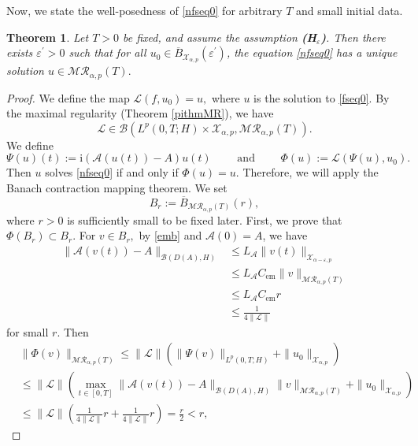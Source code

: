 \documentclass[reqno]{amsart}
\newtheorem{theorem}{Theorem}[section]
\numberwithin{equation}{section}
\begin{document}
Now, we state the well-posedness of \eqref{nfseq0} for arbitrary $T$ and small initial data.
\begin{theorem}\label{thm:quasi}
Let $T>0$ be fixed, and assume the assumption \textbf{(H$_\varepsilon$)}. Then there exists $\varepsilon^\prime>0$ such that for all $u_0\in \overline{B}_{\mathcal{X}_{\alpha,p}}(\varepsilon^\prime)$,
the equation \eqref{nfseq0} has a unique solution $u\in \mathcal{M}\mathcal{R}_{\alpha,p}(T).$
\end{theorem}
\begin{proof}
We define the map $\mathcal{L}(f,u_0)=u,$ where $u$ is the solution to \eqref{fseq0}. By the maximal regularity (Theorem \ref{pithmMR}), we have $$\mathcal{L}\in \mathcal{B}\left(L^p(0,T;H)\times \mathcal{X}_{\alpha,p}, \mathcal{M}\mathcal{R}_{\alpha,p}(T)\right).$$ 
We define
$$\Psi(u)(t):=\mathrm{i}(\mathcal{A}(u(t))-A)u(t) \qquad \text{ and } \qquad \Phi(u):=\mathcal{L}(\Psi(u), u_0).$$
Then $u$ solves \eqref{nfseq0} if and only if $\Phi(u)=u$. Therefore, we will apply the Banach contraction mapping theorem. We set
$$B_r:=\overline{B}_{\mathcal{M}\mathcal{R}_{\alpha,p}(T)}(r),$$
where $r>0$ is sufficiently small to be fixed later. First, we prove that $\Phi (B_r)\subset B_r$. For $v\in B_r,$ by \eqref{emb} and $\mathcal{A}(0)=A$, we have 
\begin{align*}
\|\mathcal{A}(v(t))-A\|_{\mathcal{B}(D(A),H)} &\le L_\mathcal{A} \|v(t)\|_{\mathcal{X}_{\alpha-\varepsilon,p}}\\
&\le L_\mathcal{A} C_{\mathrm{em}} \|v\|_{\mathcal{M}\mathcal{R}_{\alpha,p}(T)}\\
&\le  L_\mathcal{A} C_{\mathrm{em}} r\\
& \le \frac{1}{4\|\mathcal{L}\|}
\end{align*}
for small $r$. Then
\begin{align*}
&\|\Phi(v)\|_{\mathcal{M}\mathcal{R}_{\alpha,p}(T)} \le \|\mathcal{L}\| \left(\|\Psi(v)\|_{L^p(0,T;H)}+\|u_0\|_{\mathcal{X}_{\alpha,p}}\right)\\
&\le \|\mathcal{L}\| \left(\max_{t\in [0,T]} \|\mathcal{A}(v(t))-A\|_{\mathcal{B}(D(A),H)}\|v\|_{\mathcal{M}\mathcal{R}_{\alpha,p}(T)}+\|u_0\|_{\mathcal{X}_{\alpha,p}}\right)\\
& \le \|\mathcal{L}\| \left(\frac{1}{4\|\mathcal{L}\|} r +\frac{1}{4\|\mathcal{L}\|} r\right)=\frac{r}{2}<r,

\end{align*}
\end{proof}
\end{document}
